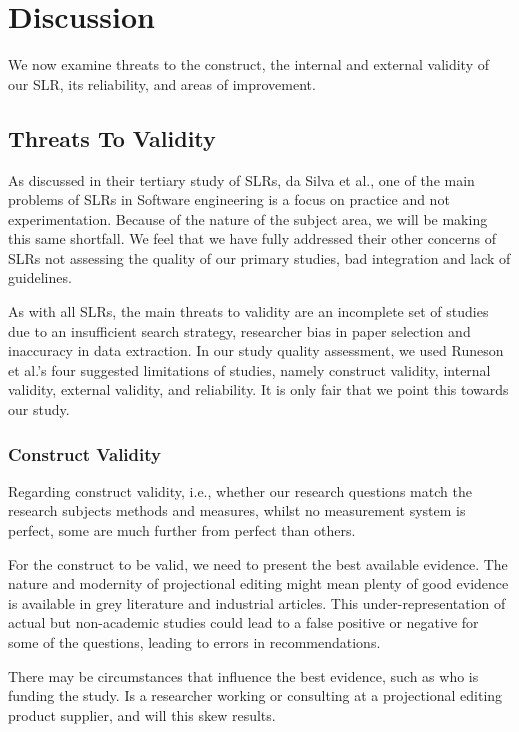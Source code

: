 \section{Discussion}
\label{section:slr_discussion}

We now examine threats to the construct, the internal and external validity of our SLR, its reliability, and areas of improvement.

 
\subsection{Threats To Validity}  
As discussed in their tertiary study of SLRs, da Silva et al.\cite{DaSilvaFabioQ.B2011Syos}, one of the main problems of SLRs in Software engineering is a focus on practice and not experimentation.
Because of the nature of the subject area, we will be making this same shortfall. 
We feel that we have fully addressed their other concerns of SLRs not assessing the quality of our primary studies, bad integration and lack of guidelines.

As with all SLRs, the main threats to validity are an incomplete set of studies due to an insufficient search strategy, researcher bias in paper selection and inaccuracy in data extraction.
In our study quality assessment, we used Runeson et al.'s\cite{runeson2009guidelines} four suggested limitations of studies, namely construct validity, internal validity, external validity, and reliability.
It is only fair that we point this towards our study.

\subsubsection{Construct Validity}
Regarding construct validity, i.e., whether our research questions match the research subjects methods and measures, whilst no measurement system is perfect, some are much further from perfect than others.

For the construct to be valid, we need to present the best available evidence.
The nature and modernity of projectional editing might mean plenty of good evidence is available in grey literature and industrial articles. 
This under-representation of actual but non-academic studies could lead to a false positive or negative for some of the questions, leading to errors in recommendations.

There may be circumstances that influence the best evidence, such as who is funding the study. 
Is a researcher working or consulting at a projectional editing product supplier, and will this skew results.

